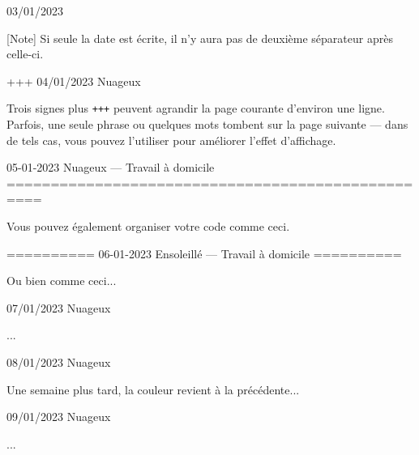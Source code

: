 \documentclass[11pt, paperstyle=light yellow, color entry, day-month-year]{jwjournal}
\begin{document}
03/01/2023

  [Note] Si seule la date est écrite, il n'y aura pas de deuxième séparateur après celle-ci.


+++
04/01/2023  Nuageux

  Trois signes plus \texttt{+++} peuvent agrandir la page courante d'environ une ligne. Parfois, une seule phrase ou quelques mots tombent sur la page suivante --- dans de tels cas, vous pouvez l'utiliser pour améliorer l'effet d'affichage.



05-01-2023    Nuageux       --- Travail à domicile
==================================================

Vous pouvez également organiser votre code comme ceci.


==========
06-01-2023    Ensoleillé    --- Travail à domicile
==========

Ou bien comme ceci...



07/01/2023  Nuageux

  ...



08/01/2023  Nuageux

  Une semaine plus tard, la couleur revient à la précédente...



09/01/2023  Nuageux

  ...
\end{document}
